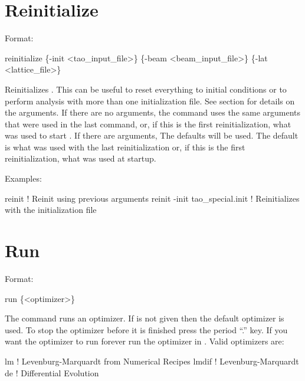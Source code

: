 {%
\section{Reinitialize}
\label{s:reinit}

Format:
\begin{example}
  reinitialize \{-init <tao_input_file>\} \{-beam <beam_input_file>\} \{-lat <lattice_file>\}
\end{example}

\vskip 0.2in 

Reinitializes \tao. This can be useful to reset everything to initial
conditions or to perform analysis with more than one initialization
file.  See section  for details on the arguments.
If there are no arguments, the  command uses the same
arguments that were used in the last  command, or, if
this is the first reinitialization, what was used to start \tao. If
there are arguments, The defaults will be used.  The default
 is what was used with the last reinitialization or,
if this is the first reinitialization, what was used at startup.

Examples:
\begin{example}
  reinit                         ! Reinit using previous arguments
  reinit -init tao_special.init  ! Reinitializes \tao with the initialization file 
\end{example}


\section{Run}
\label{s:run}

Format:
\begin{example}
  run \{<optimizer>\}
\end{example}

\vskip 0.2in The  command runs an optimizer. If
 is not given then the default optimizer is used. To
stop the optimizer before it is finished press the period ``.''
key. If you want the optimizer to run forever run the optimizer in
. Valid optimizers are:
\begin{example}
  lm            ! Levenburg-Marquardt from Numerical Recipes 
  lmdif         ! Levenburg-Marquardt 
  de            ! Differential Evolution
\end{example}

}
